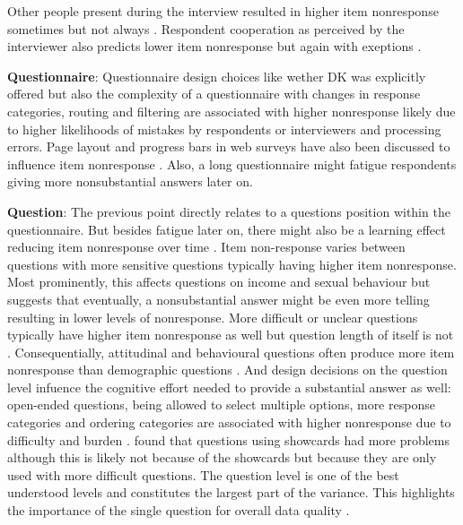 \documentclass[a4paper,12pt]{article}
\begin{document}
 Other people present during the interview resulted in higher item nonresponse sometimes \citep{kupekDeterminantsItemNonresponse1998} but not always \citep{tuSocialDistanceRespondent2007, silberEffectsQuestionRespondent2021}. Respondent cooperation as perceived by the interviewer also predicts lower item nonresponse \citep{tuSocialDistanceRespondent2007} but again with exeptions \citep{silberEffectsQuestionRespondent2021}.
 
\textbf{Questionnaire}:
 Questionnaire design choices like wether DK was explicitly offered but also the complexity of a questionnaire with changes in response categories, routing and filtering are associated with higher nonresponse \citep{messerDeterminantsItemNonresponse2012} likely due to higher likelihoods of mistakes by respondents or interviewers and processing errors. Page layout and progress bars in web surveys have also been discussed to influence item nonresponse \citep{peytchevWebSurveyDesign2006, yanShouldStayShould2011, sarrafSurveyPageLength2014}. Also, a long questionnaire might fatigue respondents giving more nonsubstantial answers later on.
 
\textbf{Question}:
The previous point directly relates to a questions position within the questionnaire. But besides fatigue later on, there might also be a learning effect reducing item nonresponse over time \citep{holbrookInterviewerErrorsHelp2016, olsonEffectsRespondentQuestion2019}.
Item non-response varies between questions with more sensitive questions typically having higher item nonresponse. Most prominently, this affects questions on income \citep{yanTrendsIncomeNonresponse2010} and sexual behaviour \citep{kupekDeterminantsItemNonresponse1998} but \citet{olsonEffectsRespondentQuestion2019} suggests that eventually, a nonsubstantial answer might be even more telling resulting in lower levels of nonresponse. More difficult or unclear questions typically have higher item nonresponse as well but question length of itself is not \citep{holbrookImpactQuestionRespondent2006, messerDeterminantsItemNonresponse2012, holbrookInterviewerErrorsHelp2016, olsonEffectsRespondentQuestion2019}. Consequentially, attitudinal and behavioural questions often produce more item nonresponse than demographic questions \citep{olsonEffectsRespondentQuestion2019, silberEffectsQuestionRespondent2021}. And design decisions on the question level infuence the cognitive effort needed to provide a substantial answer as well: open-ended questions, being allowed to select multiple options, more response categories and ordering categories are associated with higher nonresponse due to difficulty and burden \citep{holbrookImpactQuestionRespondent2006, holbrookInterviewerErrorsHelp2016, olsonEffectsRespondentQuestion2019, silberEffectsQuestionRespondent2021}. \citet{holbrookInterviewerErrorsHelp2016} found that questions using showcards had more problems although this is likely not because of the showcards but because they are only used with more difficult questions. The question level is one of the best understood levels and constitutes the largest part of the variance. This highlights the importance of the single question for overall data quality \citep{olsonEffectsRespondentQuestion2019}.
\end{document}

